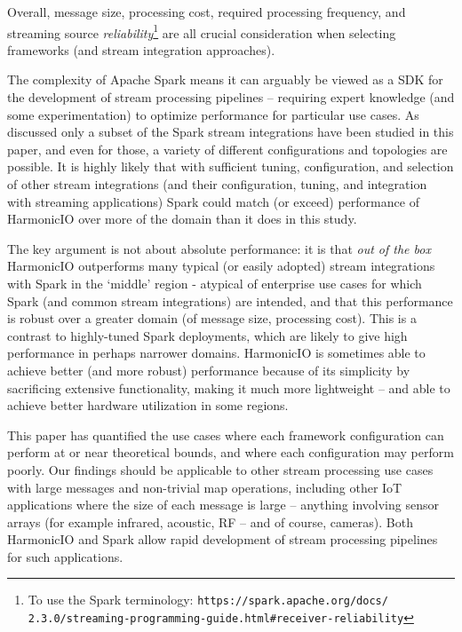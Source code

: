 \documentclass[conference]{IEEEtran}
\begin{document}
Overall, message size, processing cost, required processing frequency, and streaming source \emph{reliability}\footnote{To use the Spark terminology: \texttt{https://spark.apache.org/docs/\\2.3.0/streaming-programming-guide.html\#receiver-reliability}} are all crucial consideration when selecting frameworks (and stream integration approaches).


The complexity of Apache Spark means it can arguably be viewed as a SDK for the development of stream processing pipelines -- requiring expert knowledge (and some experimentation) to optimize performance for particular use cases. As discussed only a subset of the Spark stream integrations have been studied in this paper, and even for those, a variety of different configurations and topologies are possible. It is highly likely that with sufficient tuning, configuration, and selection of other stream integrations (and their configuration, tuning, and integration with streaming applications) Spark could match (or exceed) performance of HarmonicIO over more of the domain than it does in this study.

The key argument is not about absolute performance: it is that \emph{out of the box} HarmonicIO outperforms many typical (or easily adopted) stream integrations with Spark in the `middle' region - atypical of enterprise use cases for which Spark (and common stream integrations) are intended, and that this performance is robust over a greater domain (of message size, processing cost). This is a contrast to highly-tuned Spark deployments, which are likely to give high performance in perhaps narrower domains. HarmonicIO is sometimes able to achieve better (and more robust) performance because of its simplicity by sacrificing extensive functionality, making it much more lightweight -- and able to achieve better hardware utilization in some regions.

This paper has quantified the use cases where each framework configuration can perform at or near theoretical bounds, and where each configuration may perform poorly.
Our findings should be applicable to other stream processing use cases with large messages and non-trivial map operations, including other IoT applications where the size of each message is large -- anything involving sensor arrays (for example infrared, acoustic, RF -- and of course, cameras). Both HarmonicIO and Spark allow rapid development of stream processing pipelines for such applications.
\end{document}
